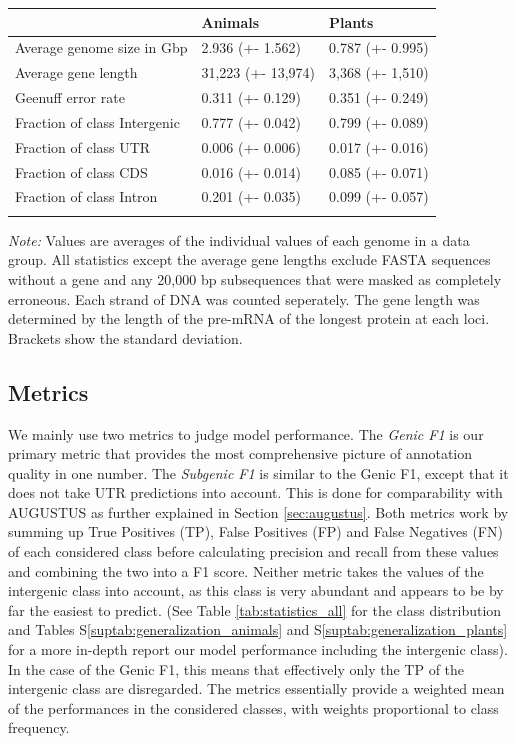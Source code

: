 \documentclass{bioinfo}
\newcounter{suptab}
\begin{document}
\begin{methods}
\begin{table}[!htb]
 {
\begin{tabular}{@{}lll@{}}
\toprule & Animals & Plants\\
\midrule
Average genome size in Gbp& 2.936 (+- 1.562) & 0.787 (+- 0.995) \\
Average gene length & 31,223 (+- 13,974)& 3,368 (+- 1,510)\\
Geenuff error rate & 0.311 (+- 0.129) & 0.351 (+- 0.249) \\
Fraction of class Intergenic  & 0.777 (+- 0.042) & 0.799 (+- 0.089) \\
Fraction of class UTR & 0.006 (+- 0.006) & 0.017 (+- 0.016) \\
Fraction of class CDS & 0.016 (+- 0.014) & 0.085 (+- 0.071) \\
Fraction of class Intron & 0.201 (+- 0.035) & 0.099 (+- 0.057) \\
\botrule
\end{tabular}}{{\it Note:} Values are averages of the individual values of each 
genome in a data group. All statistics except the average gene lengths exclude
FASTA sequences without a gene and any 20,000 bp subsequences that were masked as completely 
erroneous. Each strand of DNA was counted seperately. The gene length was 
determined by the length of the pre-mRNA of the longest protein at each
loci. Brackets show the standard deviation.}
\end{table}


\subsection{Metrics}
We mainly use two metrics to judge model performance. The {\it Genic F1} is our 
primary metric that provides the most comprehensive picture of annotation quality 
in one number. The {\it Subgenic F1} is similar to the Genic F1, except that it does 
not take UTR predictions into account. This is done for comparability with AUGUSTUS 
as further explained in Section \ref{sec:augustus}. Both metrics work by summing up 
True Positives (TP), False Positives (FP) and False Negatives (FN) of each 
considered class before calculating precision and recall from these values and 
combining the two into a F1 score. Neither metric takes the values of the 
intergenic class into account, as this class is very abundant and appears to be by 
far the easiest to predict. (See Table \ref{tab:statistics_all} for the class 
distribution and Tables S\ref{suptab:generalization_animals} 
and S\ref{suptab:generalization_plants} for a more in-depth report our model performance 
including the intergenic class). In the case of the Genic F1, this means that 
effectively only the TP of the intergenic class are disregarded. The metrics 
essentially provide a weighted mean of the performances in the considered classes,
with weights proportional to class frequency.


\end{methods}
\end{document}
